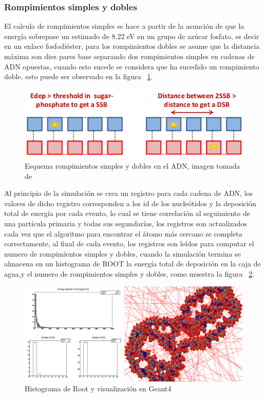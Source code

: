 \subsubsection{Rompimientos simples y dobles}
El calculo de rompimientos simples se hace a partir  de la asunción de que la energía sobrepase un estimado de 8.22 eV en un grupo de azúcar fosfato, es decir en un enlace fosfodiéster, para los rompimientos dobles se asume que la distancia máxima son diez pares base separando dos rompimientos simples en cadenas de ADN opuestas, cuando esto sucede se considera que ha sucedido un rompimiento doble\cite{pdblib}, esto puede ser observado en la figura ~\ref{fig:sbdb}.

\begin{figure}[htbp]
    \centering
    \includegraphics[width=.8\linewidth]{./Figures/romp.png}
    \caption[Esquema rompimientos simples y dobles en el ADN]{Esquema rompimientos simples y dobles en el ADN, imagen tomada de \cite{handson} }
    \label{fig:sbdb}
\end{figure}

Al principio de la simulación se crea un registro para cada cadena de ADN, los valores de dicho registro corresponden a los id de los nucleótidos y la deposición total de energía por cada evento, lo cual se tiene correlación al seguimiento de una partícula primaria y todas sus segundarías, los registros son actualizados cada vez que el algoritmo para encontrar el átomo más cercano se completa correctamente, al final de cada evento, los registros son leídos para computar el numero de rompimientos simples y dobles, cuando la simulación termina se almacena  en un histograma de ROOT la energía total de deposición en la caja de agua,y el numero de rompimientos simples y dobles\cite{pdblib}, como muestra la figura ~\ref{fig:histosbdb}.

\begin{figure}[htbp]
    \centering
    \includegraphics[width=1\linewidth]{./Figures/c1.png}
    \caption[Histograma de Root]{Histograma de Root y visualización en Geant4}
    \label{fig:histosbdb}
\end{figure}

